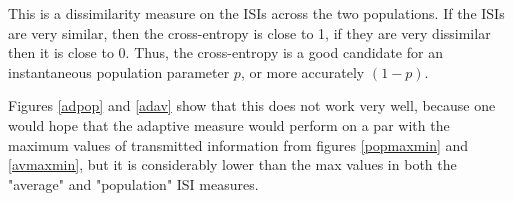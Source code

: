 This is a dissimilarity measure on the ISIs across the two populations.  If the ISIs are very similar, then the cross-entropy is close to 1, if they are very dissimilar then it is close to 0.  Thus, the cross-entropy is a good candidate for an instantaneous population parameter $p$, or more accurately $(1-p)$.

Figures \ref{adpop} and \ref{adav} show that this does not work very well, because one would hope that the adaptive measure would perform on a par with the maximum values of transmitted information from figures \ref{popmaxmin} and \ref{avmaxmin}, but it is considerably lower than the max values in both the "average" and "population" ISI measures.


%
%
%
